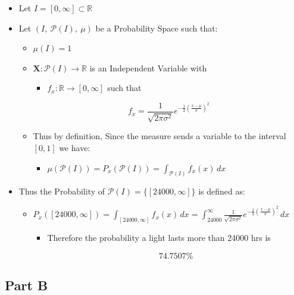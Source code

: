 \documentclass[]{report}
\begin{document}
	\begin{itemize}
		\item Let $I = [0, \infty] \subset \mathbb{R}$
		
		\item Let $(I, \ \mathcal{P}(I), \ \mu) $ be a Probability Space such that:
		
		\begin{itemize}
			\item $\mu(I) = 1$
			
			\item $ \mathbf{X} : \mathcal{P}(I) \rightarrow \mathbb{R} $ is an Independent Variable with
			
			\begin{itemize}
				\item $f_{x}: \mathbb{R} \rightarrow [0, \infty]$ such that
			\end{itemize}
			
			$$ f_{x} = \frac1{\sqrt{2\pi\sigma^2}}{e}^{- \frac{1}{2} (\frac{x-\mu}{\sigma})^2}$$
			
			\item Thus by definition, Since the measure sends a variable to the interval $[0, 1]$  we have:
			
			\begin{itemize}
				\item $\mu(\mathcal{P}(I)) = P_{x} (\mathcal{P}(I) ) =  \int_{\mathcal{P}(I)}  f_{x}(x) \, dx$
			\end{itemize}
		\end{itemize}
		
		\item Thus the Probability of  $\mathcal{P}(I)  = \{[24000, \infty]\}$ is defined as:
		
		\begin{itemize}
			\item $P_{x} ([24000, \infty] ) = \int_{[24000, \infty]}  f_{x}(x) \, dx =  \int_{24000}^{\infty}  \frac1{\sqrt{2\pi\sigma^2}}{e}^{- \frac{1}{2} (\frac{x-\mu}{\sigma})^2} \, dx$
			
			
			\begin{itemize}
				\item Therefore the probability a light lasts more than 24000 hrs is 
				
				$$74.7507 \%$$
			\end{itemize}
		\end{itemize}
	\end{itemize}
	
	\subsection{Part B}
	
\end{document}
